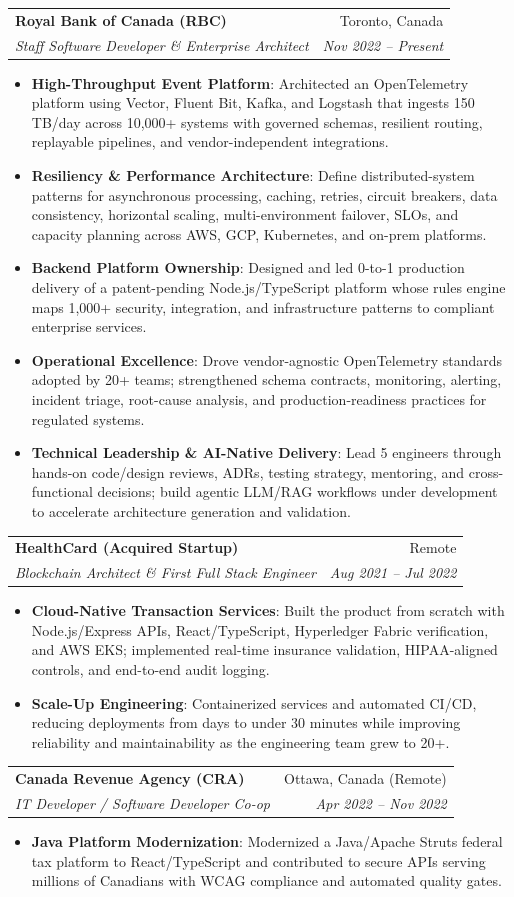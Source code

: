 \documentclass[letterpaper,9.5pt]{article}
\makeatletter
\newcommand{\resumeItem}[2]{\item\small{\textbf{#1}{: #2 \vspace{-2pt}}}}
\newcommand{\resumeSubheading}[4]{\vspace{-2pt}\item\begin{tabular*}{0.97\textwidth}{l@{\extracolsep{\fill}}r}\textbf{#1} & #2 \\\textit{\small#3} & \textit{\small #4} \\\end{tabular*}\vspace{-6pt}}
\newcommand{\resumeItemListStart}{\begin{itemize}}
\newcommand{\resumeItemListEnd}{\end{itemize}\vspace{-6pt}}
\makeatother
\begin{document}
  \resumeSubheading
    {Royal Bank of Canada (RBC)}{Toronto, Canada}
    {Staff Software Developer \& Enterprise Architect}{Nov 2022 -- Present}
  \resumeItemListStart
    \resumeItem{High-Throughput Event Platform}
      {Architected an OpenTelemetry platform using Vector, Fluent Bit, Kafka, and Logstash that ingests 150\,TB/day across 10,000+ systems with governed schemas, resilient routing, replayable pipelines, and vendor-independent integrations.}
    \resumeItem{Resiliency \& Performance Architecture}
      {Define distributed-system patterns for asynchronous processing, caching, retries, circuit breakers, data consistency, horizontal scaling, multi-environment failover, SLOs, and capacity planning across AWS, GCP, Kubernetes, and on-prem platforms.}
    \resumeItem{Backend Platform Ownership}
      {Designed and led 0-to-1 production delivery of a patent-pending Node.js/TypeScript platform whose rules engine maps 1,000+ security, integration, and infrastructure patterns to compliant enterprise services.}
    \resumeItem{Operational Excellence}
      {Drove vendor-agnostic OpenTelemetry standards adopted by 20+ teams; strengthened schema contracts, monitoring, alerting, incident triage, root-cause analysis, and production-readiness practices for regulated systems.}
    \resumeItem{Technical Leadership \& AI-Native Delivery}
      {Lead 5 engineers through hands-on code/design reviews, ADRs, testing strategy, mentoring, and cross-functional decisions; build agentic LLM/RAG workflows under development to accelerate architecture generation and validation.}
  \resumeItemListEnd

  \resumeSubheading
    {HealthCard (Acquired Startup)}{Remote}
    {Blockchain Architect \& First Full Stack Engineer}{Aug 2021 -- Jul 2022}
  \resumeItemListStart
    \resumeItem{Cloud-Native Transaction Services}
      {Built the product from scratch with Node.js/Express APIs, React/TypeScript, Hyperledger Fabric verification, and AWS EKS; implemented real-time insurance validation, HIPAA-aligned controls, and end-to-end audit logging.}
    \resumeItem{Scale-Up Engineering}
      {Containerized services and automated CI/CD, reducing deployments from days to under 30 minutes while improving reliability and maintainability as the engineering team grew to 20+.}
  \resumeItemListEnd

  \resumeSubheading
    {Canada Revenue Agency (CRA)}{Ottawa, Canada (Remote)}
    {IT Developer / Software Developer Co-op}{Apr 2022 -- Nov 2022}
  \resumeItemListStart
    \resumeItem{Java Platform Modernization}
      {Modernized a Java/Apache Struts federal tax platform to React/TypeScript and contributed to secure APIs serving millions of Canadians with WCAG compliance and automated quality gates.}
  \resumeItemListEnd
\end{document}
